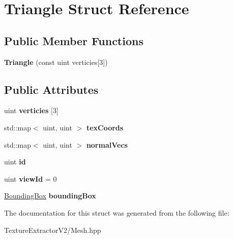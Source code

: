 \hypertarget{struct_triangle}{}\section{Triangle Struct Reference}
\label{struct_triangle}
\subsection*{Public Member Functions}
\begin{DoxyCompactItemize}
\item 
\hypertarget{struct_triangle_a88209808e641989a51c9f5e23b8857f5}{}{\bfseries Triangle} (const uint verticies\mbox{[}3\mbox{]})\label{struct_triangle_a88209808e641989a51c9f5e23b8857f5}

\end{DoxyCompactItemize}
\subsection*{Public Attributes}
\begin{DoxyCompactItemize}
\item 
\hypertarget{struct_triangle_ae6371f947daaa0debff04c10b6fadf74}{}uint {\bfseries verticies} \mbox{[}3\mbox{]}\label{struct_triangle_ae6371f947daaa0debff04c10b6fadf74}

\item 
\hypertarget{struct_triangle_a2d3dc46484a1d1cc2802caaaa4a5f1cf}{}std\+::map$<$ uint, uint $>$ {\bfseries tex\+Coords}\label{struct_triangle_a2d3dc46484a1d1cc2802caaaa4a5f1cf}

\item 
\hypertarget{struct_triangle_a9e82ef210ec3746af058c3b4793bd34d}{}std\+::map$<$ uint, uint $>$ {\bfseries normal\+Vecs}\label{struct_triangle_a9e82ef210ec3746af058c3b4793bd34d}

\item 
\hypertarget{struct_triangle_a2b02bfd83feba5fe297836b900a62c92}{}uint {\bfseries id}\label{struct_triangle_a2b02bfd83feba5fe297836b900a62c92}

\item 
\hypertarget{struct_triangle_a18682ece909b0d90107ac391f37f5cd4}{}uint {\bfseries view\+Id} = 0\label{struct_triangle_a18682ece909b0d90107ac391f37f5cd4}

\item 
\hypertarget{struct_triangle_a980bbf270a13c5ac9112e6e8c8c2ea89}{}\hyperlink{struct_bounding_box}{Bounding\+Box} {\bfseries bounding\+Box}\label{struct_triangle_a980bbf270a13c5ac9112e6e8c8c2ea89}

\end{DoxyCompactItemize}


The documentation for this struct was generated from the following file\+:\begin{DoxyCompactItemize}
\item 
Texture\+Extractor\+V2/Mesh.\+hpp\end{DoxyCompactItemize}
